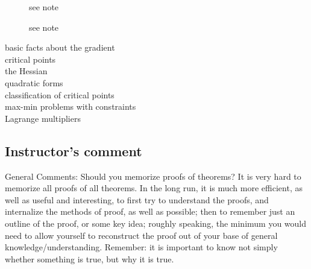 \begin{description}
\item[] see note
\item[] see note
\item[basic facts about the gradient]
\item[critical points]
\item[the Hessian]
\item[quadratic forms]
\item[classification of critical points]
\item[max-min problems with constraints]
\item[Lagrange multipliers]
\end{description}



\subsection{Instructor's comment}
General Comments: Should you memorize proofs of theorems? It is very hard to
memorize all proofs of all theorems. In the long run, it is much more efficient, as well
as useful and interesting, to first try to understand the proofs, and internalize the
methods of proof, as well as possible; then to remember just an outline of the proof,
or some key idea; roughly speaking, the minimum you would need to allow yourself
to reconstruct the proof out of your base of general knowledge/understanding.
Remember: it is important to know not simply whether something is true, but why
it is true.

